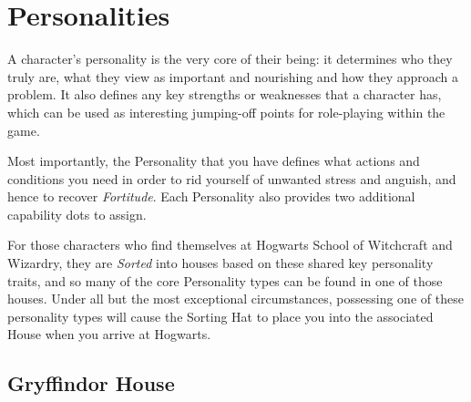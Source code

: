 \newcommand\gapText[1]
{
	~~~~~\parbox[t]{5.8 cm}{\raggedright #1}
}

\newcommand\persEntry[2]
{
	{\bf #1} & \gapText{#2} \\
}
\newcommand\personality[6]
{
	{
	\subsubsection{\key{ #1}}
	
	#2
	\renewcommand{\arraystretch}{2}
	\begin{tabular}{r l }
	
	\persEntry{Bonuses}{#3}
	
	\persEntry{Assets \& Flaws}{You draw strength from #4, though your #5 often leads you into trouble. }
	
	\persEntry{Nourishment}{You regain Fortitude whenever you #6.}
	\end{tabular}
	}
}


\chapter{Personalities}\label{C:Personality}

A character's personality is the very core of their being: it determines who they truly are, what they view as important and nourishing and how they approach a problem. It also defines any key strengths or weaknesses that a character has, which can be used as interesting jumping-off points for role-playing within the game. 

Most importantly, the Personality that you have defines what actions and conditions you need in order to rid yourself of unwanted stress and anguish, and hence to recover {\it Fortitude}. Each Personality also provides two additional capability dots to assign. 

For those characters who find themselves at Hogwarts School of Witchcraft and Wizardry, they are {\it Sorted} into houses based on these shared key personality traits, and so many of the core Personality types can be found in one of those houses. Under all but the most exceptional circumstances, possessing one of these personality types will cause the Sorting Hat to place you into the associated House when you arrive at Hogwarts. 

\section{Gryffindor House}


